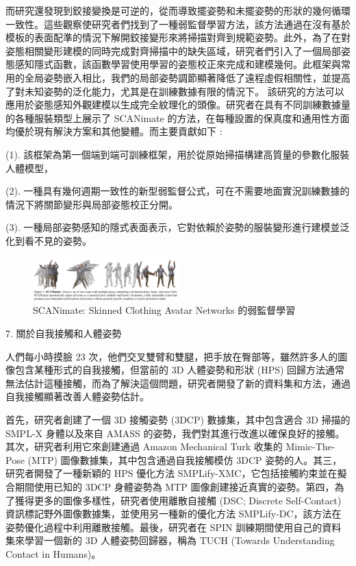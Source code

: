 \documentclass[10pt,UTF8]{ctexart}
\begin{document}
而研究還發現到鉸接變換是可逆的，從而導致擺姿勢和未擺姿勢的形狀的幾何循環一致性。這些觀察使研究者們找到了一種弱監督學習方法，該方法通過在沒有基於模板的表面配準的情況下解開鉸接變形來將掃描對齊到規範姿勢。此外，為了在對姿態相關變形建模的同時完成對齊掃描中的缺失區域，研究者們引入了一個局部姿態感知隱式函數，該函數學習使用學習的姿態校正來完成和建模幾何。此框架與常用的全局姿勢嵌入相比，我們的局部姿勢調節顯著降低了遠程虛假相關性，並提高了對未知姿勢的泛化能力，尤其是在訓練數據有限的情況下。 該研究的方法可以應用於姿態感知外觀建模以生成完全紋理化的頭像。研究者在具有不同訓練數據量的各種服裝類型上展示了 SCANimate 的方法，在每種設置的保真度和通用性方面均優於現有解決方案和其他變體。而主要貢獻如下 :

(1). 該框架為第一個端到端可訓練框架，用於從原始掃描構建高質量的參數化服裝人體模型，

(2). 一種具有幾何週期一致性的新型弱監督公式，可在不需要地面實況訓練數據的情況下將關節變形與局部姿態校正分開。

(3). 一種局部姿勢感知的隱式表面表示，它對依賴於姿勢的服裝變形進行建模並泛化到看不見的姿勢。

\begin{figure}[H]
\centering 
\includegraphics[width=0.50\textwidth]{r6.png} 
\caption{SCANimate: Skinned Clothing Avatar Networks 的弱監督學習}
\label{Test}
\end{figure}

7. 關於自我接觸和人體姿勢

人們每小時摸臉 23 次，他們交叉雙臂和雙腿，把手放在臀部等，雖然許多人的圖像包含某種形式的自我接觸，但當前的 3D 人體姿勢和形狀 (HPS) 回歸方法通常無法估計這種接觸，而為了解決這個問題，研究者開發了新的資料集和方法，通過自我接觸顯著改善人體姿勢估計。

首先，研究者創建了一個 3D 接觸姿勢 (3DCP) 數據集，其中包含適合 3D 掃描的 SMPL-X 身體以及來自 AMASS 的姿勢，我們對其進行改進以確保良好的接觸。其次，研究者利用它來創建通過 Amazon Mechanical Turk 收集的 Mimic-The-Pose (MTP) 圖像數據集，其中包含通過自我接觸模仿 3DCP 姿勢的人。其三，研究者開發了一種新穎的 HPS 優化方法 SMPLify-XMC，它包括接觸約束並在擬合期間使用已知的 3DCP 身體姿勢為 MTP 圖像創建接近真實的姿勢。第四，為了獲得更多的圖像多樣性，研究者使用離散自接觸 (DSC;  Discrete Self-Contact) 資訊標記野外圖像數據集，並使用另一種新的優化方法 SMPLify-DC，該方法在姿勢優化過程中利用離散接觸。最後，研究者在 SPIN 訓練期間使用自己的資料集來學習一個新的 3D 人體姿勢回歸器，稱為 TUCH (Towards Understanding Contact in Humans)。
\end{document}
